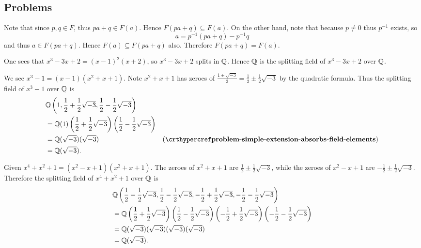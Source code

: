 \subsection*{Problems}
\begin{questions}
    \item Note that since $p, q \in F$, thus $pa + q \in F(a)$. Hence $F(pa+q) \subseteq F(a)$. On the other hand, note that because $p \neq 0$ thus $p^{-1}$ exists, so
    \[
        a = p^{-1}(pa+q) - p^{-1}q
    \]
    and thus $a \in F(pa+q)$. Hence $F(a) \subseteq F(pa+q)$ also. Therefore $F(pa+q) = F(a)$.

    \item \begin{partquestions}{\alph*}
        \item One sees that $x^3-3x+2 = (x-1)^2(x+2)$, so $x^3-3x+2$ splits in $\mathbb{Q}$. Hence $\mathbb{Q}$ is the splitting field of $x^3-3x+2$ over $\mathbb{Q}$.

        \item We see $x^3 - 1 = (x-1)(x^2+x+1)$. Note $x^2 + x + 1$ has zeroes of $\frac{1\pm\sqrt{-3}}{2} = \frac12 \pm \frac12\sqrt{-3}$ by the quadratic formula. Thus the splitting field of $x^3 - 1$ over $\mathbb{Q}$ is
        \begin{align*}
            &\Q\left(1, \frac12 + \frac12\sqrt{-3}, \frac12 - \frac12\sqrt{-3}\right)\\
            &=\Q(1)\left(\frac12 + \frac12\sqrt{-3}\right)\left(\frac12 - \frac12\sqrt{-3}\right)\\
            &=\Q(\sqrt{-3})(\sqrt{-3}) & (\myref{problem-simple-extension-absorbs-field-elements})\\
            &=\Q(\sqrt{-3}).
        \end{align*}

        \item Given $x^4 + x^2 + 1 = (x^2 - x + 1)(x^2 + x + 1)$. The zeroes of $x^2 + x + 1$ are $\frac12 \pm \frac12\sqrt{-3}$, while the zeroes of $x^2 - x + 1$ are $-\frac12 \pm \frac12\sqrt{-3}$. Therefore the splitting field of $x^4 + x^2 + 1$ over $\mathbb{Q}$ is
        \begin{align*}
            &\mathbb{Q}\left(\frac12 + \frac12\sqrt{-3}, \frac12 - \frac12\sqrt{-3}, -\frac12 + \frac12\sqrt{-3}, -\frac12 - \frac12\sqrt{-3}\right)\\
            &=\mathbb{Q}\left(\frac12 + \frac12\sqrt{-3}\right)\left(\frac12 - \frac12\sqrt{-3}\right)\left(-\frac12 + \frac12\sqrt{-3}\right)\left(-\frac12 - \frac12\sqrt{-3}\right)\\
            &=\mathbb{Q}(\sqrt{-3})(\sqrt{-3})(\sqrt{-3})(\sqrt{-3})\\
            &= \mathbb{Q}(\sqrt{-3}).
        \end{align*}


\end{partquestions}
\end{questions}
